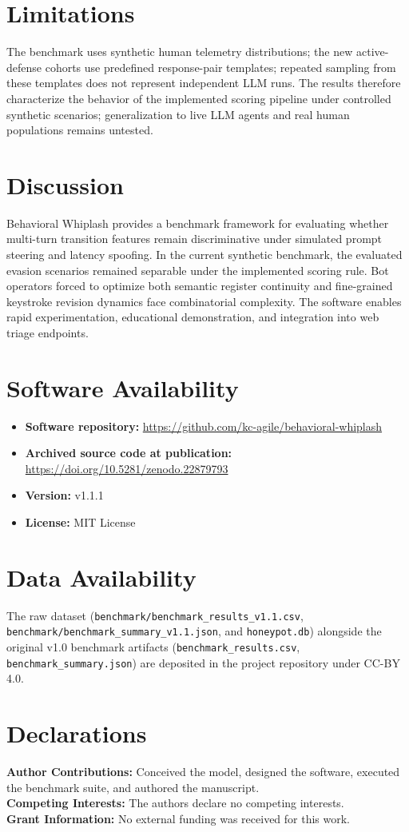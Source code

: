 \documentclass[10pt,a4paper]{article}
\begin{document}
\section*{Limitations}
The benchmark uses synthetic human telemetry distributions; the new active-defense cohorts use predefined response-pair templates; repeated sampling from these templates does not represent independent LLM runs. The results therefore characterize the behavior of the implemented scoring pipeline under controlled synthetic scenarios; generalization to live LLM agents and real human populations remains untested.

\section*{Discussion}
Behavioral Whiplash provides a benchmark framework for evaluating whether multi-turn transition features remain discriminative under simulated prompt steering and latency spoofing. In the current synthetic benchmark, the evaluated evasion scenarios remained separable under the implemented scoring rule. Bot operators forced to optimize both semantic register continuity and fine-grained keystroke revision dynamics face combinatorial complexity. The software enables rapid experimentation, educational demonstration, and integration into web triage endpoints.

\section*{Software Availability}
\begin{itemize}
    \item \textbf{Software repository:} \url{https://github.com/kc-agile/behavioral-whiplash}
    \item \textbf{Archived source code at publication:} \url{https://doi.org/10.5281/zenodo.22879793}
    \item \textbf{Version:} v1.1.1
    \item \textbf{License:} MIT License
\end{itemize}

\section*{Data Availability}
The raw dataset (\texttt{benchmark/benchmark\_results\_v1.1.csv}, \texttt{benchmark/benchmark\_summary\_v1.1.json}, and \texttt{honeypot.db}) alongside the original v1.0 benchmark artifacts (\texttt{benchmark\_results.csv}, \texttt{benchmark\_summary.json}) are deposited in the project repository under CC-BY 4.0.

\section*{Declarations}
\noindent\textbf{Author Contributions:} Conceived the model, designed the software, executed the benchmark suite, and authored the manuscript.\\
\textbf{Competing Interests:} The authors declare no competing interests.\\
\textbf{Grant Information:} No external funding was received for this work.



\end{document}
